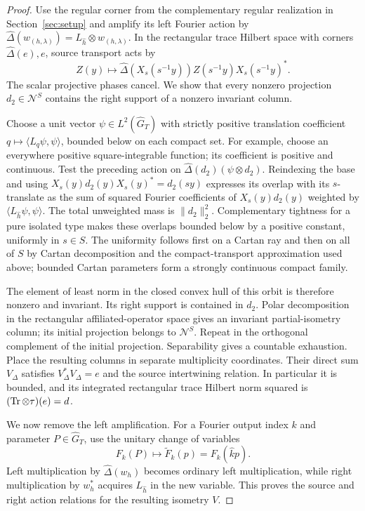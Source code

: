 \begin{proof}
Use the regular corner from the complementary regular realization in Section~\ref{sec:setup} and
amplify its left Fourier action by
$\widehat\Delta(w_{(h,\lambda)})=L_{\hat h}\otimes w_{(h,\lambda)}$.
In the rectangular trace Hilbert space with corners
$\widehat\Delta(e),e$, source transport acts by
\[
 Z(y)\longmapsto
 \widehat\Delta(X_s(s^{-1}y))Z(s^{-1}y)X_s(s^{-1}y)^*.
\]
The scalar projective phases cancel.  We show that every nonzero
projection $d_2\in\mathcal N^S$ contains the right support of a nonzero
invariant column.

Choose a unit vector $\psi\in L^2(\widehat G_T)$ with strictly positive
translation coefficient
$q\mapsto\langle L_q\psi,\psi\rangle$, bounded below on each compact
set.  For example, choose an everywhere positive square-integrable
function; its coefficient is positive and continuous.  Test the
preceding action on
$\widehat\Delta(d_2)(\psi\otimes d_2)$.  Reindexing the base and using
$X_s(y)d_2(y)X_s(y)^*=d_2(sy)$ expresses its overlap with its $s$-translate
as the sum of squared Fourier coefficients of $X_s(y)d_2(y)$ weighted
by $\langle L_{\hat h}\psi,\psi\rangle$.  The total unweighted mass is
$\|d_2\|_2^2$.  Complementary tightness for a pure isolated type makes
these overlaps bounded below by a positive constant, uniformly in
$s\in S$.  The uniformity follows first on a Cartan ray and then on
all of $S$ by Cartan decomposition and the compact-transport
approximation used above; bounded
Cartan parameters form a strongly continuous compact family.

The element of least norm in the closed convex hull of this orbit is
therefore nonzero and invariant.  Its right support is contained in
$d_2$.  Polar decomposition in the rectangular affiliated-operator
space gives an invariant partial-isometry column; its initial
projection belongs to $\mathcal N^S$.  Repeat in the orthogonal
complement of the initial projection.  Separability gives a countable
exhaustion.  Place the resulting columns in separate multiplicity
coordinates.  Their direct sum $V_\Delta$ satisfies
$V_\Delta^*V_\Delta=e$ and the source intertwining relation.  In
particular it is bounded, and its integrated rectangular trace
Hilbert norm squared is $(\operatorname{Tr}\otimes\tau)(e)=d$.

We now remove the left amplification.  For a Fourier output index
$k$ and parameter $P\in\widehat G_T$, use the unitary change of variables
\[
 F_k(P)\longmapsto \widetilde F_k(p)=F_k(\hat k p).
\]
Left multiplication by $\widehat\Delta(w_h)$ becomes ordinary left
multiplication, while right multiplication by $w_h^*$ acquires
$L_{\hat h}$ in the new variable.  This proves the source and right
action relations for the resulting isometry $V$.


\end{proof}
